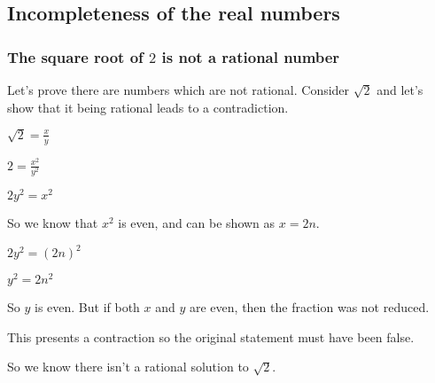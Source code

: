 
\subsection{Incompleteness of the real numbers}

\subsubsection{The square root of \(2\) is not a rational number}

Let's prove there are numbers which are not rational. Consider \(\sqrt 2\) and let's show that it being rational leads to a contradiction.

\(\sqrt 2=\frac{x}{y}\)

\(2=\frac{x^2}{y^2}\)

\(2y^2=x^2\)

So we know that \(x^2\) is even, and can be shown as \(x=2n\).

\(2y^2=(2n)^2\)

\(y^2=2n^2\)

So \(y\) is even. But if both \(x\) and \(y\) are even, then the fraction was not reduced.

This presents a contraction so the original statement must have been false.

So we know there isn't a rational solution to \(\sqrt 2\).

